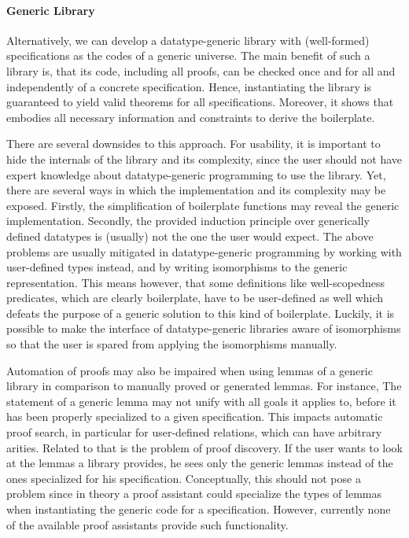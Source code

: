 \paragraph{Generic Library}
Alternatively, we can develop a datatype-generic library with (well-formed)
\Knot specifications as the codes of a generic universe. The main benefit of such a
library is, that its code, including all proofs, can be checked once and for all and 
independently of a concrete specification. Hence, instantiating the library is
guaranteed to yield valid theorems for all specifications. Moreover, it shows that
\Knot embodies all necessary information and constraints to derive the
boilerplate.

There are several downsides to this approach. For usability, it is important to
hide the internals of the library and its complexity, since the user should
not have expert knowledge about datatype-generic programming to
use the library. Yet, there are several ways in which the implementation and
its complexity may be exposed. Firstly, the simplification of
boilerplate functions may reveal the generic implementation. Secondly,
the provided induction principle over generically defined
datatypes is (usually) not the one the user would expect. 
The above problems are usually mitigated in datatype-generic programming by
working with user-defined types instead, and by writing isomorphisms
to the generic representation. This means however, that some definitions like
well-scopedness predicates, which are clearly boilerplate, have to be
user-defined as well which defeats the purpose of a generic solution to this
kind of boilerplate. Luckily, it is possible to make the interface of
datatype-generic libraries aware of isomorphisms so that the user is spared from
applying the isomorphisms manually.

Automation of proofs may also be impaired when using lemmas of a generic library 
in comparison to manually proved or generated lemmas. For instance, The
statement of a generic lemma may not unify with all goals it applies to, before
it has been properly specialized to a given specification. This impacts
automatic proof search, in particular for user-defined relations,
which can have arbitrary arities. Related to that is the problem of proof
discovery. If the user wants to look at the lemmas a library provides, he sees
only the generic lemmas instead of the ones specialized for his
specification. Conceptually, this should not pose a problem since in theory a
proof assistant could specialize the types of lemmas when instantiating the
generic code for a specification. However, currently none of the available proof
assistants provide such functionality.

